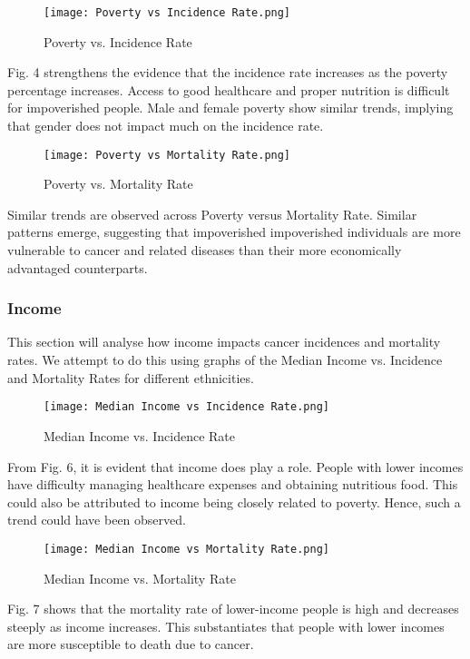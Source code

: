 \documentclass[conference]{IEEEtran}
\begin{document}
\begin{figure}[htbp]
\centerline{\texttt{[image: Poverty vs Incidence Rate.png]}}
\caption{Poverty vs. Incidence Rate}
\label{fig}
\end{figure}

Fig. 4 strengthens the evidence that the incidence rate increases as the poverty percentage increases. Access to good healthcare and proper nutrition is difficult for impoverished people. Male and female poverty show similar trends, implying that gender does not impact much on the incidence rate.

\begin{figure}[htbp]
\centerline{\texttt{[image: Poverty vs Mortality Rate.png]}}
\caption{Poverty vs. Mortality Rate}
\label{fig}
\end{figure}

Similar trends are observed across Poverty versus Mortality Rate. Similar patterns emerge, suggesting that impoverished impoverished individuals are more vulnerable to cancer and related diseases than their more economically advantaged counterparts.

\subsubsection{Income}
This section will analyse how income impacts cancer incidences and mortality rates. We attempt to do this using graphs of the Median Income vs. Incidence and Mortality Rates for different ethnicities.

\begin{figure}[htbp]
\centerline{\texttt{[image: Median Income vs Incidence Rate.png]}}
\caption{Median Income vs. Incidence Rate}
\label{fig}
\end{figure}

From Fig. 6, it is evident that income does play a role. People with lower incomes have difficulty managing healthcare expenses and obtaining nutritious food. This could also be attributed to income being closely related to poverty. Hence, such a trend could have been observed.

\begin{figure}[htbp]
\centerline{\texttt{[image: Median Income vs Mortality Rate.png]}}
\caption{Median Income vs. Mortality Rate}
\label{fig}
\end{figure}

Fig. 7 shows that the mortality rate of lower-income people is high and decreases steeply as income increases. This substantiates that people with lower incomes are more susceptible to death due to cancer.
\end{document}
